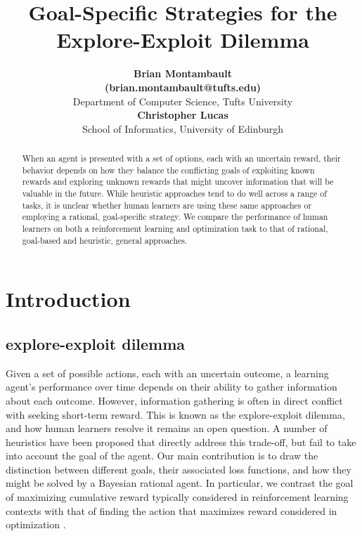 \documentclass[10pt,letterpaper]{article}
\title{Goal-Specific Strategies for the Explore-Exploit Dilemma}
\author{\textbf{Brian Montambault} \\\textbf{(brian.montambault@tufts.edu)}
\\ Department of Computer Science, Tufts University
\\\textbf{Christopher Lucas} \\ School of Informatics, University of Edinburgh}
\begin{document}
	
	\maketitle
	
	
	\begin{abstract}
	When an agent is presented with a set of options, each with an uncertain reward, their behavior depends on how they balance the conflicting goals of exploiting known rewards and exploring unknown rewards that might uncover information that will be valuable in the future. While heuristic approaches tend to do well across a range of tasks, it is unclear whether human learners are using these same approaches or employing a rational, goal-specific strategy. We compare the performance of human learners on both a reinforcement learning and optimization task to that of rational, goal-based and heuristic, general approaches.
	\end{abstract}


	\section{Introduction}
	
	\subsection{explore-exploit dilemma}
	Given a set of possible actions, each with an uncertain outcome, a learning agent's performance over time depends on their ability to gather information about each outcome. However, information gathering is often in direct conflict with seeking short-term reward. This is known as the explore-exploit dilemma, and how human learners resolve it remains an open question. A number of heuristics have been proposed that directly address this trade-off, but fail to take into account the goal of the agent. Our main contribution is to draw the distinction between different goals, their associated loss functions, and how they might be solved by a Bayesian rational agent. In particular, we contrast the goal of maximizing cumulative reward typically considered in reinforcement learning contexts \citep[e.g.][]{Sutton1998a} with that of finding the action that maximizes reward considered in optimization \citep[e.g.][]{Snoek}.
	
\end{document}
